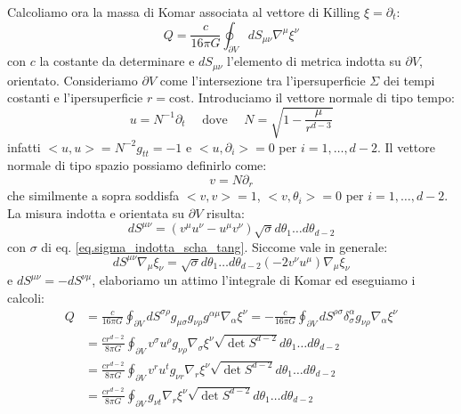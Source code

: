Calcoliamo ora la massa di Komar associata al vettore di Killing $\xi = \partial_t$:
\begin{equation*}
    Q = \frac{c}{16\pi G} \oint_{\partial V} dS_{\mu\nu} \nabla^\mu \xi^\nu
\end{equation*}
con $c$ la costante da determinare e $dS_{\mu\nu}$ l'elemento di metrica indotta su $\partial V$, orientato. Consideriamo $\partial V$ come l'intersezione tra l'ipersuperficie $\Sigma$ dei tempi costanti e l'ipersuperficie $r= \textrm{cost.}$  Introduciamo il vettore normale di tipo tempo:
\begin{equation*}
    u = N^{-1}\partial_t \quad \textrm{ dove } \quad N = \sqrt{1 - \frac{\mu}{r^{d-3}}}
\end{equation*}
infatti $<u,u> = N^{-2} g_{tt} = -1$ e $< u, \partial_i> = 0$ per $i=1, \dots, d-2$.
Il vettore normale di tipo spazio possiamo definirlo come:
\begin{equation*}
    v = N\partial_r
\end{equation*}
che similmente a sopra soddisfa $<v,v> = 1$, $<v, \theta_i> = 0$ per $i= 1, \dots, d-2$. La misura indotta e orientata su $\partial V$ risulta:
\begin{equation*}
    dS^{\mu\nu} = (v^\mu u^\nu - u^\mu v^\nu)\sqrt{\sigma}d\theta_1\dots d\theta_{d-2}
\end{equation*}
con $\sigma$ di eq. \ref{eq.sigma_indotta_scha_tang}. Siccome vale in generale:
\begin{equation*}
    dS^{\mu\nu}\nabla_\mu\xi_\nu = \sqrt{\sigma}d\theta_1\dots d\theta_{d-2} ( - 2v^\nu u^\mu)\nabla_\mu \xi_\nu
\end{equation*}
 e $dS^{\mu\nu} = - dS^{\nu\mu}$, elaboriamo un attimo l'integrale di Komar ed eseguiamo i calcoli:
\begin{align*}
    Q &= \frac{c}{16\pi G}\oint_{\partial V} dS^{\sigma\rho}g_{\mu\sigma}g_{\nu\rho}g^{\alpha\mu}\nabla_\alpha \xi^\nu = - \frac{c}{16\pi G} \oint_{\partial V}dS^{\rho\sigma}\delta^\alpha_\sigma g_{\nu\rho}\nabla_\alpha \xi^\nu \\
     &=  \frac{c r^{d-2}}{8\pi G} \oint_{\partial V} v^\sigma u^\rho g_{\nu\rho}\nabla_\sigma \xi^\nu \sqrt{\det S^{d-2}}d\theta_1 \dots d\theta_{d-2} \\
    &=  \frac{c r^{d-2}}{8\pi G} \oint_{\partial V} v^r u^t g_{\nu r}\nabla_r \xi^\nu \sqrt{\det S^{d-2}}d\theta_1 \dots d\theta_{d-2} \\
    &= \frac{c r^{d-2}}{8\pi G} \oint_{\partial V} g_{\nu t}\nabla_r \xi^\nu \sqrt{\det S^{d-2}}d\theta_1 \dots d\theta_{d-2}
\end{align*}
